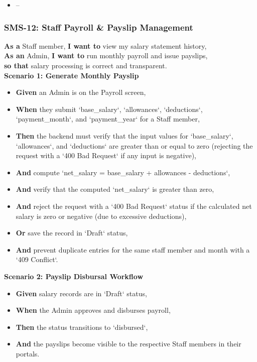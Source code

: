 \begin{itemize}
  \item --
\end{itemize}

\subsubsection{SMS-12: Staff Payroll \& Payslip Management}
\noindent \textbf{As a} Staff member, \textbf{I want to} view my salary statement history, \\
\noindent \textbf{As an} Admin, \textbf{I want to} run monthly payroll and issue payslips, \\
\noindent \textbf{so that} salary processing is correct and transparent. \\



\noindent\textbf{Scenario 1: Generate Monthly Payslip}\\
\begin{itemize}
  \item \textbf{Given} an Admin is on the Payroll screen,
  \item \textbf{When} they submit `base\_salary`, `allowances`, `deductions`, `payment\_month`, and `payment\_year` for a Staff member,
  \item \textbf{Then} the backend must verify that the input values for `base\_salary`, `allowances`, and `deductions` are greater than or equal to zero (rejecting the request with a `400 Bad Request` if any input is negative),
  \item \textbf{And} compute `net\_salary = base\_salary + allowances - deductions`,
  \item \textbf{And} verify that the computed `net\_salary` is greater than zero,
  \item \textbf{And} reject the request with a `400 Bad Request` status if the calculated net salary is zero or negative (due to excessive deductions),
  \item \textbf{Or} save the record in `Draft` status,
  \item \textbf{And} prevent duplicate entries for the same staff member and month with a `409 Conflict`.
\end{itemize}


\noindent\textbf{Scenario 2: Payslip Disbursal Workflow}\\
\begin{itemize}
  \item \textbf{Given} salary records are in `Draft` status,
  \item \textbf{When} the Admin approves and disburses payroll,
  \item \textbf{Then} the status transitions to `disbursed`,
  \item \textbf{And} the payslips become visible to the respective Staff members in their portals.
\end{itemize}



